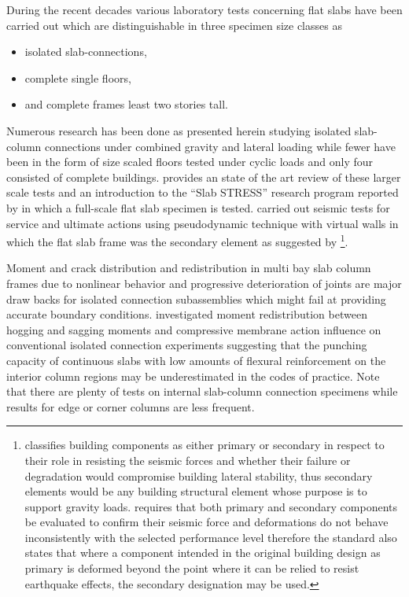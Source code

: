 \documentclass[twocolumn]{article} %
\begin{document}
During the recent decades various laboratory tests concerning flat slabs have been carried out which are distinguishable in three specimen size classes as \begin{itemize}\item isolated slab-connections, \item complete single floors, \item and complete frames least two stories tall. \end{itemize}
Numerous research has been done as presented herein studying isolated slab-column connections under combined gravity and lateral loading\citep{dovich2005,drakatos2016,hawkins1979,hueste2007,kang2006,megally2000,pan1989,robertson2002,setiawan2019,tian2008,andre2016} while fewer have been in the form of size scaled floors tested under cyclic loads\citep{hwang1993,hwang2000,rha2014} and only four consisted of complete buildings\citep{coronelli2021,fick2017,moehle1984,kang2004}. \cite{coronelli2020} provides an state of the art review of these larger scale tests and an introduction to the ``Slab STRESS'' research program reported by \cite{coronelli2021} in which a full-scale flat slab specimen is tested. \cite{coronelli2021} carried out seismic tests for service and ultimate actions using pseudodynamic technique with virtual walls in which the flat slab frame was the secondary element as suggested by \cite{asce4117,fema356}\footnote{\cite{asce4117} classifies building components as either primary or secondary in respect to their role in resisting the seismic forces and whether their failure or degradation would compromise building lateral stability, thus secondary elements would be any building structural element whose purpose is to support gravity loads. \cite{asce4117} requires that both primary and secondary components be evaluated to confirm their seismic force and deformations do not behave inconsistently with the selected performance level therefore the standard also states that where a component intended in the original building design as primary is deformed beyond the point where it can be relied to resist earthquake effects, the secondary designation may be used.}. 

Moment and crack distribution and redistribution in multi bay slab column frames due to nonlinear behavior and progressive deterioration of joints are major draw backs for isolated connection subassemblies which might fail at providing accurate boundary conditions\citep{einpaul2015,einpaul2016}. \cite{einpaul2015} investigated moment redistribution between hogging and sagging moments and compressive membrane action influence on conventional isolated connection experiments suggesting that the punching capacity of continuous slabs with low amounts of flexural reinforcement on the interior column regions may be underestimated in the codes of practice. Note that there are plenty of tests on internal slab-column connection specimens while results for edge or corner columns are less frequent. 
\end{document}
